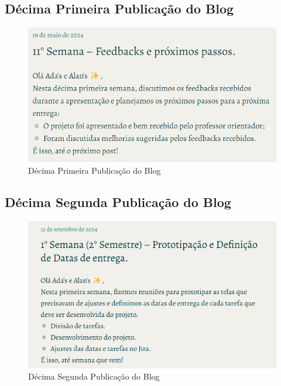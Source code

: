\begin{apendicesenv}
\subsection*{Décima Primeira Publicação do Blog}
\begin{figure}[H]
    \centering
    \includegraphics[width=1.0\linewidth]{images/Post11.png}
    \caption{Décima Primeira Publicação do Blog}
    \label{fig:decima primeira}
\end{figure}

\subsection*{Décima Segunda Publicação do Blog}
\begin{figure}[H]
    \centering
    \includegraphics[width=1.0\linewidth]{images/post12.png}
    \caption{Décima Segunda Publicação do Blog}
    \label{fig:decima primeira}
\end{figure}


\end{apendicesenv}
